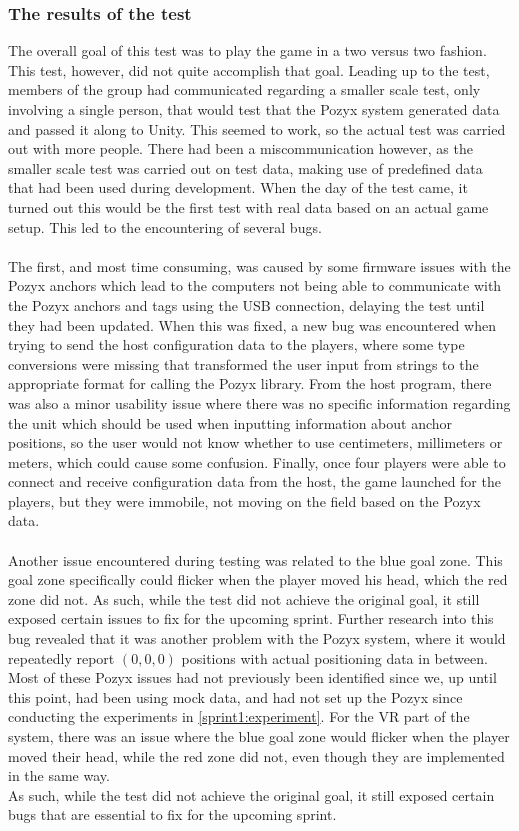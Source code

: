 \subsubsection{The results of the test}
The overall goal of this test was to play the game in a two versus two fashion.
This test, however, did not quite accomplish that goal.
Leading up to the test, members of the group had communicated regarding a smaller scale test, only involving a single person, that would test that the Pozyx system generated data and passed it along to Unity.
This seemed to work, so the actual test was carried out with more people.
There had been a miscommunication however, as the smaller scale test was carried out on test data, making use of predefined data that had been used during development.
When the day of the test came, it turned out this would be the first test with real data based on an actual game setup.
This led to the encountering of several bugs.
\\\\
The first, and most time consuming, was caused by some firmware issues with the Pozyx anchors which lead to the computers not being able to communicate with the Pozyx anchors and tags using the USB connection, delaying the test until they had been updated.
When this was fixed, a new bug was encountered when trying to send the host configuration data to the players, where some type conversions were missing that transformed the user input from strings to the appropriate format for calling the Pozyx library.
From the host program, there was also a minor usability issue where there was no specific information regarding the unit which should be used when inputting information about anchor positions, so the user would not know whether to use centimeters, millimeters or meters, which could cause some confusion.
Finally, once four players were able to connect and receive configuration data from the host, the game launched for the players, but they were immobile, not moving on the field based on the Pozyx data.
\\\\
Another issue encountered during testing was related to the blue goal zone.
This goal zone specifically could flicker when the player moved his head, which the red zone did not.
As such, while the test did not achieve the original goal, it still exposed certain issues to fix for the upcoming sprint.
Further research into this bug revealed that it was another problem with the Pozyx system, where it would repeatedly report $(0,0,0)$ positions with actual positioning data in between.\\
Most of these Pozyx issues had not previously been identified since we, up until this point, had been using mock data, and had not set up the Pozyx since conducting the experiments in \autoref{sprint1:experiment}.
For the VR part of the system, there was an issue where the blue goal zone would flicker when the player moved their head, while the red zone did not, even though they are implemented in the same way.\\
As such, while the test did not achieve the original goal, it still exposed certain bugs that are essential to fix for the upcoming sprint.
